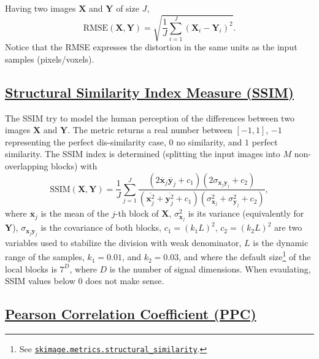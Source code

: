 \documentclass{article}
\begin{document}
Having two images $\mathbf{X}$ and $\mathbf{Y}$ of size $J$,
\begin{equation}
  \text{RMSE}(\mathbf{X},\mathbf{Y}) = \sqrt{\frac{1}{J}\sum_{i=1}^J(\mathbf{X}_i - \mathbf{Y}_i)^2}.
\end{equation}
Notice that the RMSE expresses the distortion in the same units as the
input samples (pixels/voxels).


\subsection{\href{https://en.wikipedia.org/wiki/Structural_similarity_index_measure}{Structural
    Similarity Index Measure (SSIM)}}

The SSIM try to model the human perception of the differences between
two images $\mathbf{X}$ and $\mathbf{Y}$. The metric returns a real
number between $[-1, 1]$, $-1$ representing the perfect dis-similarity
case, $0$ no similarity, and $1$ perfect similarity. The SSIM index is
determined (splitting the input images into $M$ non-overlapping blocks)
with
\begin{equation}
  \text{SSIM}(\mathbf{X}, \mathbf{Y}) = \frac{1}{J} \sum_{j=1}^J \frac{(2\overline{\mathbf{x}}_j \overline{\mathbf{y}}_j + c_1)(2\sigma_{\mathbf{x}_j \mathbf{y}_j} + c_2)}{(\overline{\mathbf{x}_j^2} + \overline{\mathbf{y}_j^2} + c_1)(\sigma^2_{\mathbf{x}_j} + \sigma^2_{\mathbf{y}_j} + c_2)},
\end{equation}
where $\overline{\mathbf x}_j$ is the mean of the $j$-th block of
$\mathbf{X}$, $\sigma^2_{\mathbf{x}_j}$ is its variance (equivalently
for $\mathbf{Y}$), $\sigma_{\mathbf{x}_j\mathbf{y}_j}$ is the
covariance of both blocks, $c_1=(k_1L)^2$, $c_2=(k_2L)^2$ are two
variables used to stabilize the division with weak denominator, $L$ is
the dynamic range of the samples, $k_1=0.01$, and $k_2=0.03$, and
where the default
size\footnote{See \href{https://scikit-image.org/docs/stable/api/skimage.metrics.html\#skimage.metrics.structural_similarity}{\texttt{skimage.metrics.structural\_similarity}}.}
of the local blocks is $7^D$, where $D$ is the number of signal
dimensions. When evaulating, SSIM values below $0$ does not make
sense.


\subsection{\href{https://en.wikipedia.org/wiki/Pearson_correlation_coefficient}{Pearson Correlation Coefficient (PPC)}}
\end{document}
